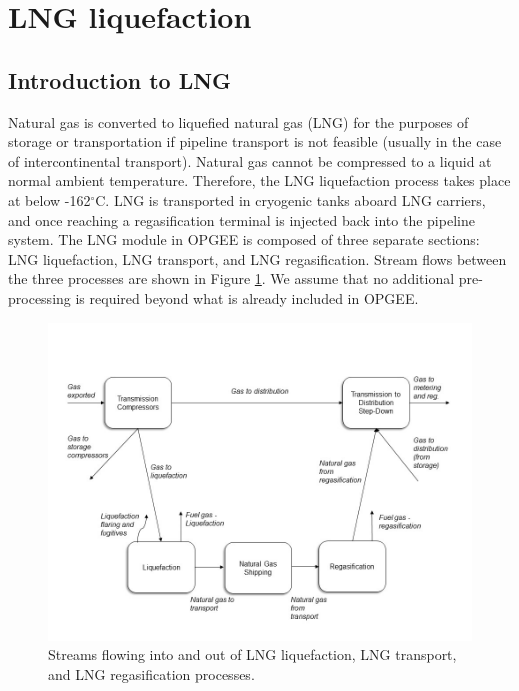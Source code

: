 \documentclass[11pt]{report}
\begin{document}
\clearpage

\section{LNG liquefaction}
\label{sec:lng_liquefaction}

\subsection{Introduction to LNG}

Natural gas is converted to liquefied natural gas (LNG) for the purposes of storage or transportation if pipeline transport is not feasible (usually in the case of intercontinental transport). Natural gas cannot be compressed to a liquid at normal ambient temperature. Therefore, the LNG liquefaction process takes place at below -162$^{\circ}$C. LNG is transported in cryogenic tanks aboard LNG carriers, and once reaching a regasification terminal is injected back into the pipeline system.
The LNG module in OPGEE is composed of three separate sections: LNG liquefaction, LNG transport, and LNG regasification. Stream flows between the three processes are shown in Figure \ref{fig:LNG_flows}. We assume that no additional pre-processing is required beyond what is already included in OPGEE.

\begin{figure}[ht]
\includegraphics[width=1\columnwidth]{images/Liquefaction_flow.jpg}
\caption{Streams flowing into and out of LNG liquefaction, LNG transport, and LNG regasification processes.}
\label{fig:LNG_flows}
\end{figure}
\end{document}
